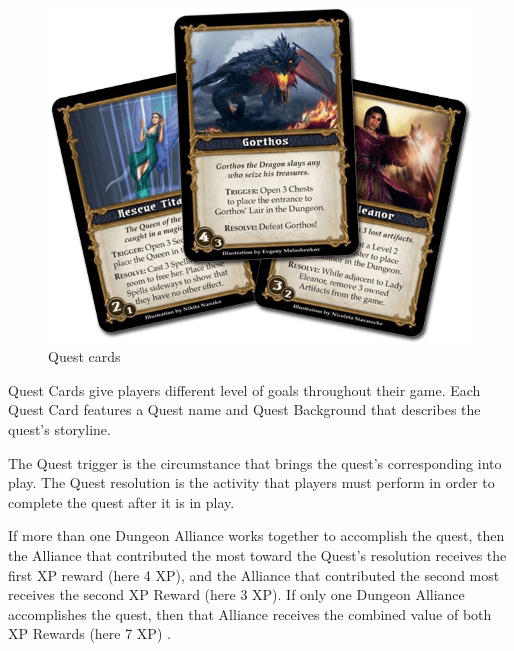 \begin{minipage}{\columnwidth}
\setlength{\columnsep}{2pt}%
\setlength{\intextsep}{2pt}%
\begin{figure}
\centering\includegraphics[width=.5\columnwidth]{images/quest_cards.png}
\caption*{Quest cards}
\end{figure}

Quest Cards give players different level of goals throughout their game. Each Quest Card features a Quest name  and Quest Background  that describes the quest's storyline.

The Quest trigger  is the circumstance that brings the quest's
corresponding  into play. The Quest resolution  is the activity that players must
perform in order to complete the quest after it is in play.

If more than one Dungeon Alliance works together to
accomplish the quest, then the Alliance that contributed the
most toward the Quest's resolution receives the first XP
reward (here 4 XP), and the Alliance that contributed the second most
receives the second XP Reward (here 3 XP). If only one Dungeon Alliance
accomplishes the quest, then that Alliance receives the
combined value of both XP Rewards (here 7 XP) .


\end{minipage}
